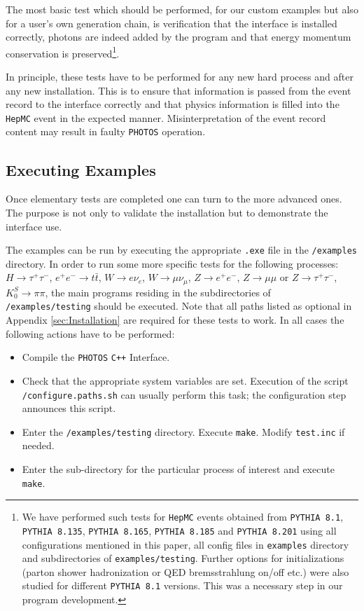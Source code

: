 \documentclass[]{Photos_interface_design}
\begin{document}
The most basic test which should be performed, for our custom examples but also for a user's own generation chain, 
 is verification that the interface is installed correctly, 
photons are indeed added by the program and that energy momentum 
conservation is preserved\footnote{
We have performed such tests for {\tt HepMC} events obtained 
from {\tt PYTHIA 8.1}, {\tt PYTHIA 8.135}, {\tt PYTHIA 8.165}, {\tt PYTHIA 8.185} and {\tt PYTHIA 8.201}
using all configurations mentioned in this paper, all config files in {\tt examples} directory and
subdirectories of {\tt examples/testing}. Further  options for initializations 
(parton shower hadronization or QED bremsstrahlung on/off etc.) were also studied
for different {\tt PYTHIA 8.1} versions. This was a necessary step in our program development.}.

In principle, these tests have to be performed for any new hard 
process and after any new installation. This is to ensure that 
information is passed from the event record to the interface 
correctly and that physics information is filled into the {\tt HepMC} event 
in the expected manner. Misinterpretation of the event record content may result in 
faulty {\tt PHOTOS} operation.


\subsection{Executing Examples}

Once elementary tests are completed one can turn to the more advanced ones.
The purpose is not only to validate the installation but to demonstrate the
interface use.

The examples can be run by executing the appropriate {\tt .exe} file in the {\tt /examples} directory.
In order to run some more specific tests for the following processes:
$H \rightarrow \tau^+ \tau^-$, $ e^+ e^- \rightarrow t \bar t$,
$W \rightarrow e \nu_e$, $W \rightarrow \mu \nu_\mu$,
$Z \rightarrow e^+ e^-$, $Z \rightarrow \mu \mu$ or $Z \rightarrow \tau^+ \tau^-$,
$K_{0}^{S} \rightarrow \pi \pi$,
the main programs residing in the subdirectories of {\tt /examples/testing} should be executed.
Note that all paths listed as optional in Appendix \ref{sec:Installation} are required for these
tests to work.
In all cases the following actions have to be performed:

\begin{itemize}
  \item Compile the {\tt PHOTOS} {\tt C++} Interface. 
 \item  Check that the appropriate system variables are set. Execution of  the script \\
{\tt /configure.paths.sh} can usually perform this task; the configuration step 
announces this script.
  \item Enter the {\tt /examples/testing} directory. Execute {\tt make}. 
Modify {\tt test.inc} if needed.
  \item Enter the sub-directory for the particular process of interest
and execute {\tt make}.
\end{itemize}
\end{document}
